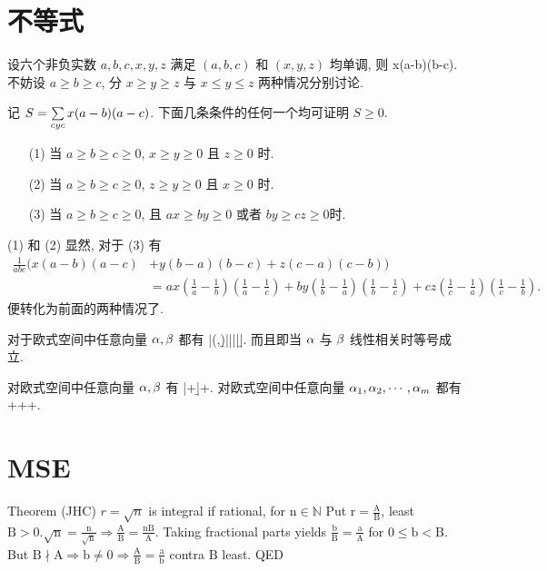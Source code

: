 \section{不等式}
设六个非负实数 $a,b,c,x,y,z$ 满足 $(a,b,c)$ 和 $(x,y,z)$ 均单调, 则
\bee
\sumcyc x(a-b)(b-c).
\eee
\et
\ba
不妨设 $a\ge b\ge c$, 分 $x\ge y\ge z$ 与 $x\le y\le z$ 两种情况分别讨论.
\ea

记 $S=\sum\limits_{cyc} x(a-b)(a-c)$. 下面几条条件的任何一个均可证明 $S\ge0$.
\begin{itemize}
 \item[(1)] 当 $a\ge b\ge c\ge 0$, $x\ge y\ge 0$ 且 $z\ge 0$ 时.
 \item[(2)] 当 $a\ge b\ge c\ge 0$, $z\ge y\ge 0$ 且 $x\ge 0$ 时.
 \item[(3)] 当 $a\ge b\ge c\ge 0$, 且 $ax\ge by\ge0$ 或者 $by\ge cz\ge 0$时.
\end{itemize}
\ec
\ba
(1) 和 (2) 显然, 对于 (3) 有
\begin{align*}
\frac{1}{abc}(x(a-b)(a-c) & +y(b-a)(b-c)+z(c-a)(c-b))\\
  & = ax\left(\frac1a-\frac1b\right)\left(\frac1a-\frac1c\right)
  +by\left(\frac1b-\frac1a\right)\left(\frac1b-\frac1c\right)+cz\left(\frac1c-\frac1a\right)\left(\frac1c-\frac1b\right).
\end{align*}
便转化为前面的两种情况了.
\ea

对于欧式空间中任意向量 $\alpha,\beta$ 都有
\bee
|(\a,\b)|\le|\a||\b|.
\eee
而且即当 $\alpha$ 与 $\beta$ 线性相关时等号成立.
\et

对欧式空间中任意向量 $\alpha,\beta$ 有
\bee
|\a+\b|\le\abs{\a}+\abs{\b}.
\eee
对欧式空间中任意向量 $\alpha_1,\alpha_2,\cdots,\alpha_m$ 都有
\bee
{}\le{}++\cdots+.
\eee
\et

\section{MSE}

Theorem (JHC) $r=\sqrt{n}$ is integral if rational, for $\mathrm{n} \in \mathbb{N}$
\et
\ba
Put $\mathrm{r}=\frac{\mathrm{A}}{\mathrm{B}}$, least $\mathrm{B}>0 . \sqrt{\mathrm{n}}=\frac{\mathrm{n}}{\sqrt{\mathrm{n}}} \Rightarrow \frac{\mathrm{A}}{\mathrm{B}}=\frac{\mathrm{nB}}{\mathrm{A}}$. Taking fractional parts yields $\frac{\mathrm{b}}{\mathrm{B}}=\frac{\mathrm{a}}{\mathrm{A}}$ for $0 \leq \mathrm{b}<\mathrm{B}$.
But $\mathrm{B} \nmid \mathrm{A} \Rightarrow \mathrm{b} \neq 0 \Rightarrow \frac{\mathrm{A}}{\mathrm{B}}=\frac{\mathrm{a}}{\mathrm{b}}$ contra $\mathrm{B}$ least. QED
\ea

